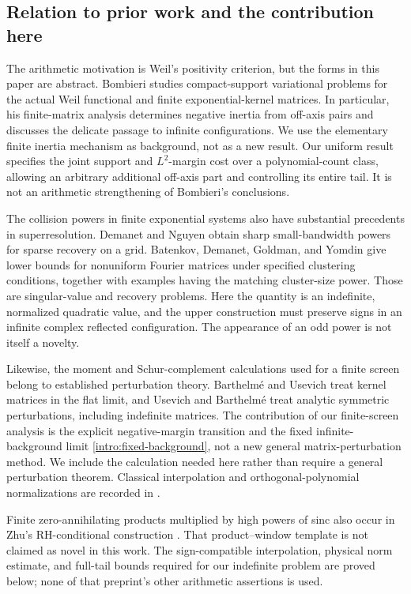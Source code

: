 \subsection{Relation to prior work and the contribution here}
The arithmetic motivation is Weil's positivity criterion,
but the forms in this paper are abstract. Bombieri
\cite[Sections 4, 8--11]{Bombieri} studies compact-support
variational problems for the actual Weil functional and
finite exponential-kernel matrices. In particular, his
finite-matrix analysis determines negative inertia from
off-axis pairs and discusses the delicate passage to
infinite configurations. We use the elementary finite
inertia mechanism as background, not as a new result.
Our uniform result specifies the joint support and
\(L^2\)-margin cost over a polynomial-count class, allowing
an arbitrary additional off-axis part and controlling its
entire tail. It is not an arithmetic strengthening of
Bombieri's conclusions.

The collision powers in finite exponential systems also
have substantial precedents in superresolution. Demanet
and Nguyen \cite[Theorem 2 and Corollary 3]{DemanetNguyen}
obtain sharp small-bandwidth powers for sparse recovery
on a grid. Batenkov, Demanet, Goldman, and Yomdin
\cite[Theorems 3.2 and 3.9]{BatenkovEtAl} give lower bounds
for nonuniform Fourier matrices under specified clustering
conditions, together with examples having the matching
cluster-size power. Those are
singular-value and recovery problems. Here the quantity
is an indefinite, normalized quadratic value, and the
upper construction must preserve signs in an infinite
complex reflected configuration. The appearance of an
odd power is not itself a novelty.

Likewise, the moment and Schur-complement calculations
used for a finite screen belong to established
perturbation theory. Barthelm\'e and Usevich
\cite{BarthelmeUsevich} treat kernel matrices in the flat
limit, and Usevich and Barthelm\'e \cite{UsevichBarthelme}
treat analytic symmetric perturbations, including
indefinite matrices. The contribution of our finite-screen
analysis is the explicit negative-margin transition and
the fixed infinite-background limit
\eqref{intro:fixed-background}, not a new general
matrix-perturbation method. We include the calculation
needed here rather than require a general perturbation
theorem. Classical interpolation and orthogonal-polynomial
normalizations are recorded in \cite{DLMF}.

Finite zero-annihilating products multiplied by high powers
of sinc also occur in Zhu's RH-conditional construction
\cite[Section 13.2]{Zhu}. That product--window template is
not claimed as novel in this work. The sign-compatible interpolation,
physical norm estimate, and full-tail bounds required for
our indefinite problem are proved below; none of that
preprint's other arithmetic assertions is used.

